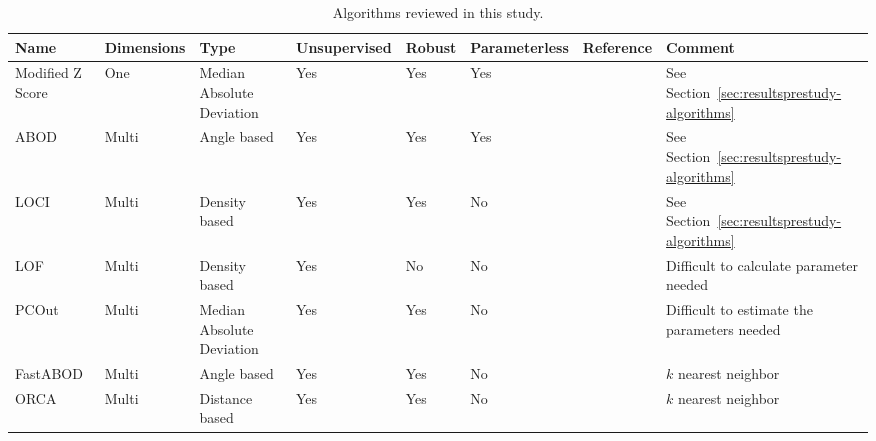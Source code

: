\begin{table}
  \caption{Algorithms reviewed in this study.}
  \label{tab:algorithms}
  \begin{tabu}{XX[2]XX[2]XX[2]X[2]X[2.5]}
    \hline
    \textbf{Name}             & \textbf{Dimensions} & \textbf{Type}                      & \textbf{Unsupervised}\strut & \textbf{Robust} & \textbf{Parameterless}\strut & \textbf{Reference}                       & \textbf{Comment}                                     \\ \hline
    Modified Z Score\strut & One        & Median Absolute Deviation & Yes          & Yes    & Yes           & \citet{garcia2012tests}       & See Section~\ref{sec:resultsprestudy-algorithms}  \\ \hline
    ABOD             & Multi      & Angle based               & Yes          & Yes    & Yes           & \citet{kriegel2008angle}      & See Section~\ref{sec:resultsprestudy-algorithms}  \\ \hline
    LOCI             & Multi      & Density based             & Yes          & Yes    & No            & \citet{papadimitriou2003loci} & See Section~\ref{sec:resultsprestudy-algorithms}  \\ \hline
    LOF              & Multi      & Density based             & Yes          & No     & No            & \citet{breunig2000lof}        & Difficult to calculate parameter needed\strut     \\ \hline
    PCOut            & Multi      & Median Absolute Deviation & Yes          & Yes    & No            & \citet{filzmoser2008outlier}  & Difficult to estimate the parameters needed\strut \\ \hline
    FastABOD         & Multi      & Angle based               & Yes          & Yes    & No            & \citet{kriegel2008angle}      & $k$ nearest neighbor                          \\ \hline
    ORCA             & Multi      & Distance based            & Yes          & Yes    & No            & \citet{bay2003mining}         & $k$ nearest neighbor                          \\ \hline
  \end{tabu}
\end{table}
